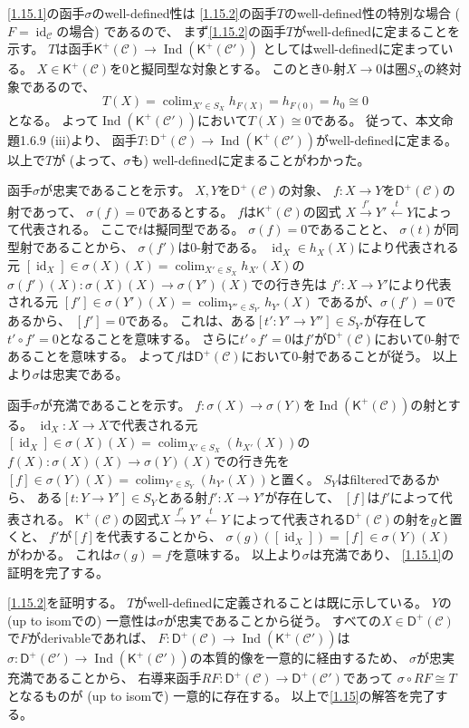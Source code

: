 \documentclass[uplatex,dvipdfmx]{jsarticle}
\makeatletter
\theoremstyle{definition}
\renewenvironment{proof}[1][\proofname]{
  \pushQED{\qed}%
  \normalfont \topsep6\p@\@plus6\p@\relax
  \trivlist
  \item[\hskip\labelsep
    #1\@addpunct{\textbf{.}}]\ignorespaces
}{%
  \popQED\endtrivlist\@endpefalse
}
\providecommand{\proofname}{証明}
\DeclareMathOperator{\id}{\mathrm{id}}
\DeclareMathOperator{\colim}{\mathrm{colim}}
\DeclareMathOperator{\Ind}{\mathrm{Ind}}
\newcommand{\sfK}{\mathsf{K}}
\newcommand{\sfD}{\mathsf{D}}
\newcommand\mcC{\mathcal{C}}
\makeatother
\begin{document}
\begin{proof}
  \ref{1.15.1}の函手\(\sigma\)のwell-defined性は
  \ref{1.15.2}の函手\(T\)のwell-defined性の特別な場合 (\(F=\id_{\mcC}\)の場合) であるので、
  まず\ref{1.15.2}の函手\(T\)がwell-definedに定まることを示す。
  \(T\)は函手\(\sfK^+(\mcC)\to \Ind(\sfK^+(\mcC'))\)
  としてはwell-definedに定まっている。
  \(X\in \sfK^+(\mcC)\)を\(0\)と擬同型な対象とする。
  このとき\(0\)-射\(X\to 0\)は圏\(S_X\)の終対象であるので、
  \[T(X) = \colim_{X'\in S_X}h_{F(X)} = h_{F(0)} = h_0 \cong 0\]
  となる。
  よって\(\Ind(\sfK^+(\mcC'))\)において\(T(X)\cong 0\)である。
  従って、本文命題1.6.9 (iii)より、
  函手\(T:\sfD^+(\mcC)\to \Ind(\sfK^+(\mcC'))\)がwell-definedに定まる。
  以上で\(T\)が (よって、\(\sigma\)も) well-definedに定まることがわかった。

  函手\(\sigma\)が忠実であることを示す。
  \(X,Y\)を\(\sfD^+(\mcC)\)の対象、
  \(f:X\to Y\)を\(\sfD^+(\mcC)\)の射であって、
  \(\sigma(f) = 0\)であるとする。
  \(f\)は\(\sfK^+(\mcC)\)の図式
  \(X\xrightarrow{f'} Y' \xleftarrow{t} Y\)によって代表される。
  ここで\(t\)は擬同型である。
  \(\sigma(f) = 0\)であることと、
  \(\sigma(t)\)が同型射であることから、
  \(\sigma(f')\)は\(0\)-射である。
  \(\id_X\in h_X(X)\)により代表される元
  \([\id_X]\in \sigma(X)(X) = \colim_{X'\in S_X}h_{X'}(X)\)の
  \(\sigma(f')(X): \sigma(X)(X)\to \sigma(Y')(X)\)での行き先は
  \(f':X\to Y'\)により代表される元
  \([f']\in \sigma(Y')(X) = \colim_{Y''\in S_{Y'}}h_{Y'}(X)\)
  であるが、\(\sigma(f') = 0\)であるから、
  \([f']=0\)である。
  これは、ある\([t':Y'\to Y'']\in S_{Y'}\)が存在して
  \(t'\circ f' = 0\)となることを意味する。
  さらに\(t'\circ f' = 0\)は\(f'\)が\(\sfD^+(\mcC)\)において\(0\)-射であることを意味する。
  よって\(f\)は\(\sfD^+(\mcC)\)において\(0\)-射であることが従う。
  以上より\(\sigma\)は忠実である。

  函手\(\sigma\)が充満であることを示す。
  \(f:\sigma(X)\to \sigma(Y)\)を\(\Ind(\sfK^+(\mcC))\)の射とする。
  \(\id_X:X\to X\)で代表される元
  \([\id_X]\in \sigma(X)(X) = \colim_{X'\in S_X}(h_{X'}(X))\)の
  \(f(X):\sigma(X)(X)\to \sigma(Y)(X)\)での行き先を
  \([f]\in \sigma(Y)(X) = \colim_{Y'\in S_Y}(h_{Y'}(X))\)と置く。
  \(S_Y\)はfilteredであるから、
  ある\([t:Y\to Y']\in S_Y\)とある射\(f':X\to Y'\)が存在して、
  \([f]\)は\(f'\)によって代表される。
  \(\sfK^+(\mcC)\)の図式\(X\xrightarrow{f'}Y' \xleftarrow{t} Y\)
  によって代表される\(\sfD^+(\mcC)\)の射を\(g\)と置くと、
  \(f'\)が\([f]\)を代表することから、
  \(\sigma(g)([\id_X]) = [f]\in \sigma(Y)(X)\)がわかる。
  これは\(\sigma(g) = f\)を意味する。
  以上より\(\sigma\)は充満であり、
  \ref{1.15.1}の証明を完了する。

  \ref{1.15.2}を証明する。
  \(T\)がwell-definedに定義されることは既に示している。
  \(Y\)の (up to isomでの) 一意性は\(\sigma\)が忠実であることから従う。
  すべての\(X\in \sfD^+(\mcC)\)で\(F\)がderivableであれば、
  \(F:\sfD^+(\mcC)\to \Ind(\sfK^+(\mcC'))\)は
  \(\sigma:\sfD^+(\mcC')\to \Ind(\sfK^+(\mcC'))\)の本質的像を一意的に経由するため、
  \(\sigma\)が忠実充満であることから、
  右導来函手\(RF:\sfD^+(\mcC)\to \sfD^+(\mcC')\)であって
  \(\sigma\circ RF \cong T\)となるものが (up to isomで) 一意的に存在する。
  以上で\autoref{1.15}の解答を完了する。
\end{proof}
\end{document}
